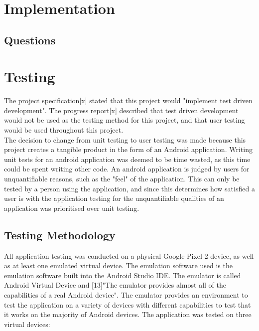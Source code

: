 \documentclass{article}
\begin{document}
\section{Implementation}
\label{section:implementation}

%
%

\subsection{Questions}

%
%

\section{Testing}
\label{section:testing}

The project specification[x] stated that this project would "implement test driven development". The progress report[x] described that test driven development would not be used as the testing method for this project, and that user testing would be used throughout this project. \\

The decision to change from unit testing to user testing was made because this project creates a tangible product in the form of an Android application. Writing unit tests for an android application was deemed to be time wasted, as this time could be spent writing other code. An android application is judged by users for unquantifiable reasons, such as the "feel" of the application. This can only be tested by a person using the application, and since this determines how satisfied a user is with the application testing for the unquantifiable qualities of an application was prioritised over unit testing. \\

\subsection{Testing Methodology}

All application testing was conducted on a physical Google Pixel 2 device, as well as at least one emulated virtual device. The emulation software used is the emulation software built into the Android Studio IDE. The emulator is called Android Virtual Device and [13]"The emulator provides almost all of the capabilities of a real Android device". The emulator provides an environment to test the application on a variety of devices with different capabilities to test that it works on the majority of Android devices. The application was tested on three virtual devices: 
\end{document}
